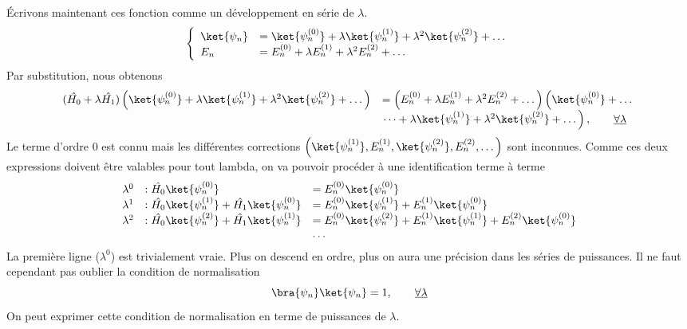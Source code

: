 	Écrivons maintenant ces fonction comme un développement en série de $\lambda$.
	\begin{equation}
	\left\{\begin{array}{ll}
	\ket{\psi_n} &= \ket{\psi_n^{(0)}}+\lambda\ket{\psi_n^{(1)}}+\lambda^2\ket{
	\psi_n^{(2)}}+\dots\\
	E_n &= E_n^{(0)}+\lambda E_n^{(1)}+\lambda^2E_n^{(2)}+\dots
	\end{array}\right.
	\end{equation}
	Par substitution, nous obtenons
	\begin{equation}
	\begin{array}{ll}
	(\hat{H_0}+\lambda\hat{H_1})\left(\ket{\psi_n^{(0)}}+\lambda\ket{\psi_n^{(1)}}
	+\lambda^2\ket{\psi_n^{(2)}}+\dots\right) &= \left(E_n^{(0)}+\lambda E_n^{(1)}
	+\lambda^2E_n^{(2)}+\dots \right)
	\left(\ket{\psi_n^{(0)}}+\dots\right.\\
	&\left.\dots+\lambda\ket{\psi_n^{(1)}}+\lambda^2\ket{\psi_n^{(2)}}+\dots\right),
	\qquad 	\underline{\forall\lambda}
	\end{array}
	\end{equation}		
	Le terme d'ordre 0 est connu mais les différentes corrections	$\left(\ket{\psi_n^{(1)}}, 
	E_n^{(1)}, 	\ket{\psi_n^{(2)}}, E_n^{(2)},\dots\right)$ sont inconnues. Comme ces deux 
	expressions doivent être valables pour tout lambda, on va pouvoir procéder à une 
	identification terme à terme
	\begin{equation}
	\begin{array}{lll}
	\lambda^0 &: \hat{H_0}\ket{\psi_n^{(0)}} &= E_n^{(0)}\ket{\psi_n^{(0)}}\\
	\lambda^1 &: \hat{H_0}\ket{\psi_n^{(1)}}+\hat{H_1}\ket{\psi_n^{(0)}} &= E_n^{(0
	)}\ket{\psi_n^{(1)}}+E_n^{(1)}\ket{\psi_n^{(0)}}\\
	\lambda^2 &: \hat{H_0}\ket{\psi_n^{(2)}}+\hat{H_1}\ket{\psi_n^{(1)}} &= E_n^{(0
	)}\ket{\psi_n^{(2)}}+E_n^{(1)}\ket{\psi_n^{(1)}}+E_n^{(2)}\ket{\psi_n^{(0)}}\\		
	&&\dots
	\end{array}
	\label{eq:9.6}
	\end{equation}
	La première ligne ($\lambda^0$) est trivialement vraie. Plus on descend en ordre, 
	plus on aura une précision dans les séries	de puissances. Il ne faut cependant pas 
	oublier la condition de normalisation 
	\begin{equation}
	\bra{\psi_n}\ket{\psi_n} = 1,\qquad \underline{\forall\lambda}
	\end{equation}
	On peut exprimer cette condition de normalisation en terme de 	puissances de $\lambda$.

